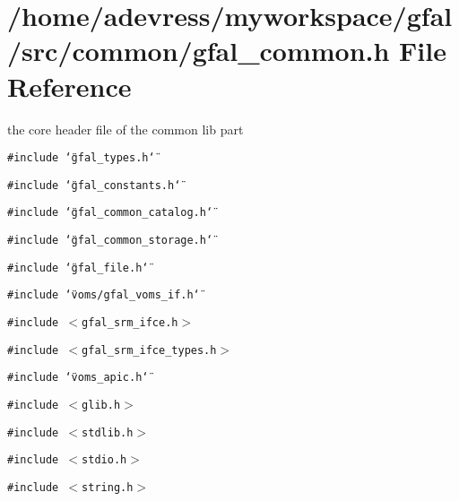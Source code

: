 \section{/home/adevress/myworkspace/gfal/src/common/gfal\_\-common.h File Reference}
\label{gfal__common_8h}
the core header file of the common lib part 

{\tt \#include \char`\"{}gfal\_\-types.h\char`\"{}}\par
{\tt \#include \char`\"{}gfal\_\-constants.h\char`\"{}}\par
{\tt \#include \char`\"{}gfal\_\-common\_\-catalog.h\char`\"{}}\par
{\tt \#include \char`\"{}gfal\_\-common\_\-storage.h\char`\"{}}\par
{\tt \#include \char`\"{}gfal\_\-file.h\char`\"{}}\par
{\tt \#include \char`\"{}voms/gfal\_\-voms\_\-if.h\char`\"{}}\par
{\tt \#include $<$gfal\_\-srm\_\-ifce.h$>$}\par
{\tt \#include $<$gfal\_\-srm\_\-ifce\_\-types.h$>$}\par
{\tt \#include \char`\"{}voms\_\-apic.h\char`\"{}}\par
{\tt \#include $<$glib.h$>$}\par
{\tt \#include $<$stdlib.h$>$}\par
{\tt \#include $<$stdio.h$>$}\par
{\tt \#include $<$string.h$>$}\par
